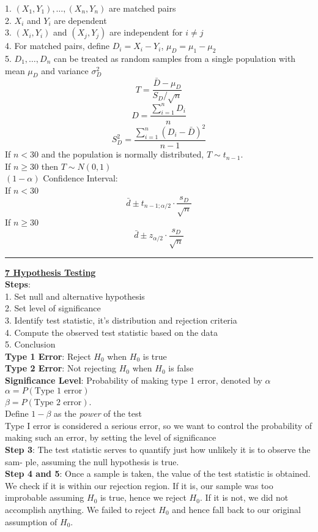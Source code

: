 \documentclass{article}
\begin{document}
\begin{multicols*}{3}
1. $(X_1,Y_1),\dots,(X_n,Y_n)$ are matched pairs\\
2. $X_i$ and $Y_i$ are dependent\\
3. $(X_i,Y_i)$ and $(X_j,Y_j)$ are independent for $i\not= j$\\
4. For matched pairs, define $D_i=X_i-Y_i$, $\mu_D=\mu_1-\mu_2$\\
5. $D_1,\dots,D_n$ can be treated as random samples from a single population with mean $\mu_D$ and variance $\sigma_D^2$\\
$$T=\frac{\bar{D}-\mu_D}{S_D/\sqrt{n}}$$
$$D=\frac{\sum_{i=1}^nD_i}{n}$$
$$S^2_D=\frac{\sum_{i=1}^n(D_i-\bar{D})^2}{n-1}$$
If $n<30$ and the population is normally distributed, $T\sim t_{n-1}$.\\
If $n\geq 30$ then $T\sim N(0,1)$\\
$(1-\alpha)$ Confidence Interval: \\
If $n<30$
$$\bar{d}\pm t_{n-1;\alpha/2}\cdot\frac{s_D}{\sqrt{n}}$$
If $n\geq 30$
$$\bar{d}\pm z_{\alpha/2}\cdot\frac{s_D}{\sqrt{n}}$$
\rule{193pt}{0.2pt}
\textbf{\underline{7 Hypothesis Testing}}\\
\textbf{Steps}: \\
1. Set null and alternative hypothesis\\
2. Set level of significance\\
3. Identify test statistic, it's distribution and rejection criteria\\
4. Compute the observed test statistic based on the data\\
5. Conclusion\\
\textbf{Type 1 Error}: Reject $H_0$ when $H_0$ is true\\
\textbf{Type 2 Error}: Not rejecting $H_0$ when $H_0$ is false\\
\textbf{Significance Level}: Probability of making type 1 error, denoted by $\alpha$\\
$\alpha=P(\text{Type 1 error})$\\
$\beta=P(\text{Type 2 error})$.\\
Define $1-\beta$ as the \textit{power} of the test\\
Type I error is considered a serious error, so we want to control the probability of making such an error, by setting the level of significance\\
\textbf{Step 3}: The test statistic serves to quantify just how unlikely it is to observe the sam- ple, assuming the null hypothesis is true.\\
\textbf{Step 4 and 5}: Once a sample is taken, the value of the test statistic is obtained. We check if it is within our rejection region. If it is, our sample was too improbable assuming $H_0$ is true, hence we reject $H_0$. If it is not, we did not accomplish anything. We failed to reject $H_0$ and hence fall back to our original assumption of $H_0$.\\

\end{multicols*}
\end{document}

